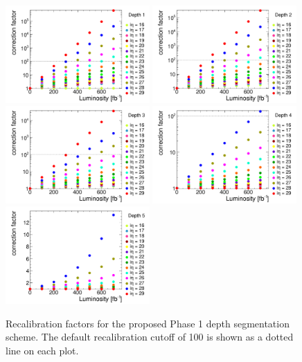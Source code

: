\begin{figure}[hbtp]
  \begin{center}
    \includegraphics[width=0.49\textwidth]{figures/mean_corr_comp_depth_1_zoom.pdf}
    \includegraphics[width=0.49\textwidth]{figures/mean_corr_comp_depth_2_zoom.pdf}
    \includegraphics[width=0.49\textwidth]{figures/mean_corr_comp_depth_3_zoom.pdf}
    \includegraphics[width=0.49\textwidth]{figures/mean_corr_comp_depth_4_zoom.pdf}
    \includegraphics[width=0.49\textwidth]{figures/mean_corr_comp_depth_5_zoom.pdf}
    \caption{Recalibration factors for the proposed Phase 1 depth segmentation scheme. The default recalibration cutoff of 100 is shown as a dotted line on each plot.}
    \label{fig:recalib_phase1}
  \end{center}
\end{figure}

